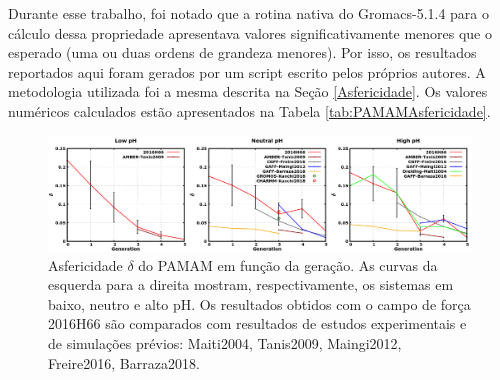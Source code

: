 Durante esse trabalho, foi notado que a rotina nativa do Gromacs-5.1.4 para o cálculo dessa propriedade apresentava valores significativamente menores que o esperado (uma ou duas ordens de grandeza menores).
Por isso, os resultados reportados aqui foram gerados por um script escrito pelos próprios autores.
A metodologia utilizada foi a mesma descrita na Seção \ref{Asfericidade}. Os valores numéricos calculados estão apresentados na Tabela \ref{tab:PAMAMAsfericidade}.

\begin{figure}[ht!]
\centering
\includegraphics[width=\textwidth]{images/PAMAMAsphericity.png}
\caption{Asfericidade $\delta$ do PAMAM em função da geração. As curvas da esquerda para a direita mostram, respectivamente, os sistemas em baixo, neutro e alto pH.
Os resultados obtidos com o campo de força 2016H66\cite{Horta2016} são comparados com resultados de estudos experimentais e de simulações prévios:
Maiti2004\cite{Maiti2004}, %
Tanis2009\cite{Tanis2009}, %
Maingi2012\cite{Maingi2012}, %
Freire2016\cite{Freire2016}, %
Barraza2018\cite{Barraza2018}.} %
\label{fig:PAMAMAsphericity}
\end{figure}


